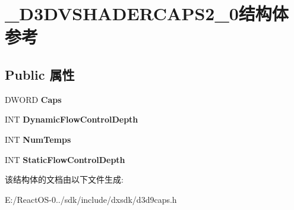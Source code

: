 \hypertarget{struct___d3_d_v_s_h_a_d_e_r_c_a_p_s2__0}{}\section{\+\_\+\+D3\+D\+V\+S\+H\+A\+D\+E\+R\+C\+A\+P\+S2\+\_\+0结构体 参考}
\label{struct___d3_d_v_s_h_a_d_e_r_c_a_p_s2__0}
\subsection*{Public 属性}
\begin{DoxyCompactItemize}
\item 
\mbox{\label{struct___d3_d_v_s_h_a_d_e_r_c_a_p_s2__0_abb9d225310b35ed994896059448f6da6}} 
D\+W\+O\+RD {\bfseries Caps}
\item 
\mbox{\label{struct___d3_d_v_s_h_a_d_e_r_c_a_p_s2__0_a75cdde56d5772206738a8fd7de1cc816}} 
I\+NT {\bfseries Dynamic\+Flow\+Control\+Depth}
\item 
\mbox{\label{struct___d3_d_v_s_h_a_d_e_r_c_a_p_s2__0_ae2ca1bd79ec30474894804087f9e057f}} 
I\+NT {\bfseries Num\+Temps}
\item 
\mbox{\label{struct___d3_d_v_s_h_a_d_e_r_c_a_p_s2__0_a976c87567cef641417a8b3bfa5021c93}} 
I\+NT {\bfseries Static\+Flow\+Control\+Depth}
\end{DoxyCompactItemize}


该结构体的文档由以下文件生成\+:\begin{DoxyCompactItemize}
\item 
E\+:/\+React\+O\+S-\/0../sdk/include/dxsdk/d3d9caps.\+h\end{DoxyCompactItemize}
